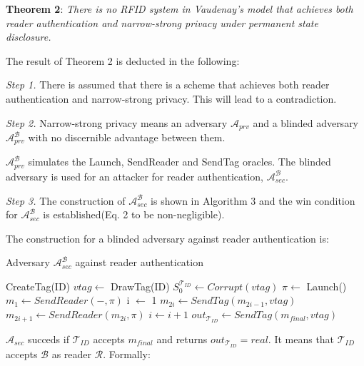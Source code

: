     \textbf{Theorem 2}: \textit{There is no RFID system in Vaudenay's model that achieves both reader authentication and narrow-strong privacy 
    under permanent state disclosure.}

    The result of Theorem 2 is deducted in the following:

    \textit{Step 1.} There is assumed that there is a scheme that achieves both reader authentication and narrow-strong privacy.
    This will lead to a contradiction.

    \textit{Step 2.} Narrow-strong privacy means an adversary $\mathcal{A}_{prv}$ and a blinded adversary $\mathcal{A}_{prv}^{\mathcal{B}}$  with no discernible
    advantage between them.
    
    $\mathcal{A}_{prv}^{\mathcal{B}}$ simulates the Launch, SendReader and SendTag oracles.
    The blinded adversary is used for an attacker for reader authentication, $\mathcal{A}_{sec}^{\mathcal{B}}$.
    
    \textit{Step 3.} The construction of $\mathcal{A}_{sec}^{\mathcal{B}}$ is shown in Algorithm 3 and the win condition for $\mathcal{A}_{sec}^{\mathcal{B}}$
    is established(Eq. 2 to be non-negligible).

    The construction for a blinded adversary against reader authentication is:
    \begin{algorithm}[H] %
        \centering
        \caption{Adversary $\mathcal{A}_{sec}^{\mathcal{B}}$ against reader authentication}
        \begin{algorithmic}[1] %
            \State CreateTag(ID)
            \State $vtag \leftarrow$ DrawTag(ID)
            \State $S_0^{\mathcal{T}_{ID}} \gets Corrupt(vtag)$
            \State $\pi \leftarrow$ Launch() 
            \State $m_1 \leftarrow SendReader(-,\pi)$ 
            \State i $\leftarrow$ 1
                \State $m_{2i} \gets SendTag(m_{2i-1}, vtag)$ 
                \State $m_{2i+1} \gets SendReader(m_{2i}, \pi)$ 
                \State $i \gets i+1$
            \EndWhile
            \State $out_{\mathcal{T}_{ID}} \gets SendTag(m_{final}, vtag)$ 
        \end{algorithmic}
    \end{algorithm}

    $\mathcal{A}_{sec}$ succeds if $\mathcal{T}_{ID}$ accepts $m_{final}$ and returns $out_{\mathcal{T}_{ID}} = real$.
    It means that $\mathcal{T}_{ID}$ accepts $\mathcal{B}$ as reader $\mathcal{R}$. Formally:


